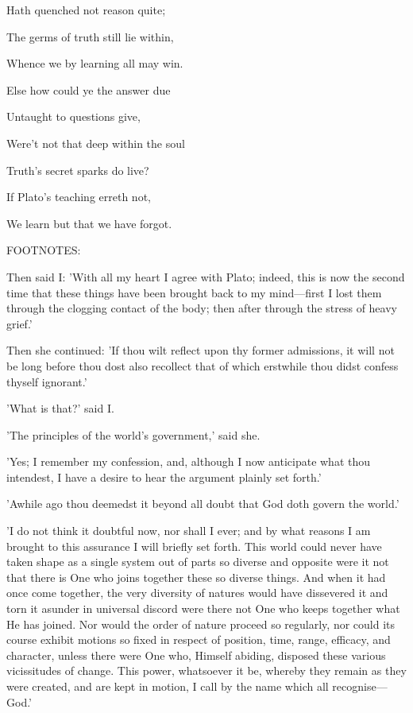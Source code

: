 Hath quenched not reason quite;

The germs of truth still lie within,

Whence we by learning all may win.

Else how could ye the answer due

Untaught to questions give,

Were't not that deep within the soul

Truth's secret sparks do live?

If Plato's teaching erreth not,

We learn but that we have forgot.

FOOTNOTES:


Then said I: 'With all my heart I agree with Plato; indeed, this is now
the second time that these things have been brought back to my
mind—first I lost them through the clogging contact of the body; then
after through the stress of heavy grief.'

Then she continued: 'If thou wilt reflect upon thy former admissions, it
will not be long before thou dost also recollect that of which erstwhile
thou didst confess thyself ignorant.'

'What is that?' said I.

'The principles of the world's government,' said she.

'Yes; I remember my confession, and, although I now anticipate what thou
intendest, I have a desire to hear the argument plainly set forth.'

'Awhile ago thou deemedst it beyond all doubt that God doth govern the
world.'

'I do not think it doubtful now, nor shall I ever; and by what reasons
I am brought to this assurance I will briefly set forth. This world
could never have taken shape as a single system out of parts so diverse
and opposite were it not that there is One who joins together these so
diverse things. And when it had once come together, the very diversity
of natures would have dissevered it and torn it asunder in universal
discord were there not One who keeps together what He has joined. Nor
would the order of nature proceed so regularly, nor could its course
exhibit motions so fixed in respect of position, time, range, efficacy,
and character, unless there were One who, Himself abiding, disposed
these various vicissitudes of change. This power, whatsoever it be,
whereby they remain as they were created, and are kept in motion, I call
by the name which all recognise—God.'

